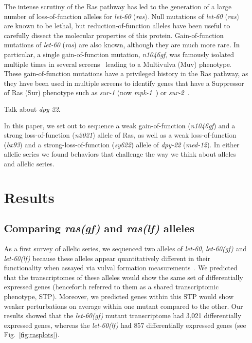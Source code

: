 \documentclass[10pt, onecolumn]{article}
\newcommand{\gene}[1]{\mbox{\emph{#1}}}
\newcommand{\ras}{\gene{let-60} (\emph{ras})}
\newcommand{\dpy}{\gene{dpy-22} (\emph{med-12})}
\newcommand{\letgfn}{3,021}
\newcommand{\letlfn}{857}
\newcommand{\letgf}{\gene{let-60(gf)}}
\newcommand{\letlf}{\gene{let-60(lf)}}
\begin{document}
The intense scrutiny of the Ras pathway has led to the generation of a large
number of loss-of-function alleles for \ras{}. Null mutations of \ras{} are
known to be lethal, but reduction-of-function alleles have been useful to
carefully dissect the molecular properties of this protein. Gain-of-function
mutations of \ras{} are also known, although they are much more rare. In particular, a
single gain-of-function mutation, \emph{n1046gf}, was famously isolated multiple
times in several screens~\cite{Han1990,Beitel1990a,Ferguson1985} leading to a
Multivulva (Muv) phenotype. 
These gain-of-function mutations have a privileged history in the Ras pathway, as
they have been used in multiple screens to
identify genes that have a Suppressor of Ras (Sur) phenotype  such as \gene{sur-1} (now \gene{mpk-1}~\cite{Lackner1994})
or \gene{sur-2}~\cite{Singh1995}.

Talk about \gene{dpy-22}.

In this paper, we set out to sequence a weak gain-of-function (\emph{n1046gf}) and a strong
loss-of-function (\emph{n2021}) allele of Ras, as well as a weak loss-of-function
(\emph{bx93}) and a strong-loss-of-function (\emph{sy622}) allele of \dpy{}. In
either allelic series we found behaviors that challenge the way we think about
alleles and allelic series.


\section*{Results}
\subsection*{Comparing \emph{ras(gf)} and \emph{ras(lf)} alleles}
As a first survey of allelic series, we sequenced two alleles of \gene{let-60},
\gene{let-60(gf)} and \gene{let-60(lf)} because these alleles appear
quantitatively different in their functionality when assayed via vulval formation
measurements~\cite{}. We predicted that the transcriptomes of these alleles
would show the same set of differentially expressed genes (henceforth referred
to them as a shared transcriptomic phenotype, STP). Moreover, we predicted genes
within this STP would show weaker perturbations on average within one mutant
compared to the other. Our results showed that the \letgf{} mutant transcriptome
had \letgfn{} differentially expressed genes, whereas the \letlf{} had \letlfn{}
differentially expressed genes (see Fig.~\ref{fig:rasplots}).
\end{document}
